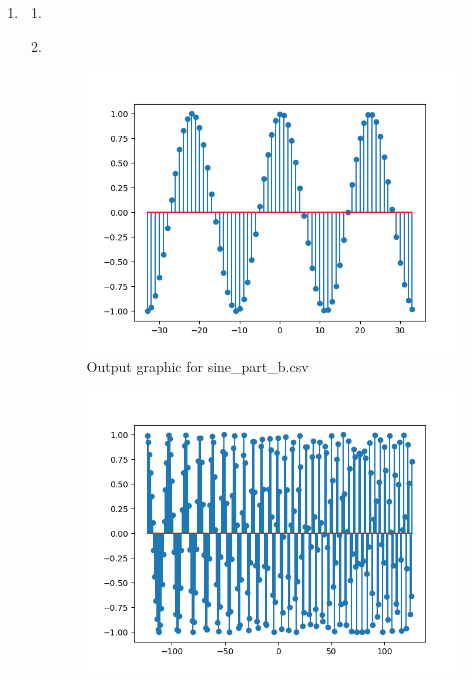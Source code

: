 \documentclass[10pt,a4paper, margin=1in]{article}
\begin{document}
\begin{enumerate}
    \item %
          \begin{enumerate}
              \item %
                    \item~\\
                    \begin{figure}[H]
                        \centering
                        \includegraphics[scale=0.75]{sine_part_b.png}
                        \caption{Output graphic for sine\_part\_b.csv}
                    \end{figure}
                    \begin{figure}[H]
                        \centering
                        \includegraphics[scale = 0.75]{chirp_part_b.png}

\end{figure}
\end{enumerate}
\end{enumerate}
\end{document}
